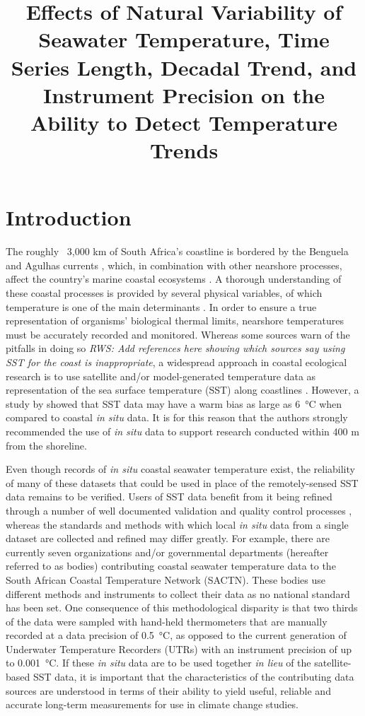 \documentclass{ametsoc}
\title{Effects of Natural Variability of Seawater Temperature, Time Series Length, Decadal Trend, and Instrument Precision on the Ability to Detect Temperature Trends}
\affiliation{Department of Biodiversity and Conservation Biology, University of the Western Cape, Bellville, Republic of South Africa}
\begin{document}
\maketitle

\section{Introduction}
The roughly ~3,000 km of South Africa's coastline is bordered by the Benguela and Agulhas currents \citep[e.g.][]{Roberts2005,Hutchings2009}, which, in combination with other nearshore processes, affect the country's marine coastal ecosystems \citep{Santos2012a}. A thorough understanding of these coastal processes is provided by several physical variables, of which temperature is one of the main determinants \citep[e.g.][]{Blanchette2008, Tittensor2010, Couce2012}. In order to ensure a true representation of organisms' biological thermal limits, nearshore temperatures must be accurately recorded and monitored. Whereas some sources warn of the pitfalls in doing so \emph{RWS: Add references here showing which sources say using SST for the coast is inappropriate}, a widespread approach in coastal ecological research is to use satellite and/or model-generated temperature data as representation of the sea surface temperature (SST) along coastlines \citep[e.g.][]{Blanchette2008, Broitman2008a, Tyberghein2012}. However, a study by \citet{Smit2013} showed that SST data may have a warm bias as large as \SI{6}{\degreeCelsius} when compared to coastal \emph{in situ} data. It is for this reason that the authors strongly recommended the use of \emph{in situ} data to support research conducted within 400 m from the shoreline.

Even though records of \emph{in situ} coastal seawater temperature exist, the reliability of many of these datasets that could be used in place of the remotely-sensed SST data remains to be verified. Users of SST data benefit from it being refined through a number of well documented validation and quality control processes \citep[e.g.][]{Reynolds1994, Brown1999, Martin2012}, whereas the standards and methods with which local \emph{in situ} data from a single dataset are collected and refined may differ greatly. For example, there are currently seven organizations and/or governmental departments (hereafter referred to as bodies) contributing coastal seawater temperature data to the South African Coastal Temperature Network (SACTN). These bodies use different methods and instruments to collect their data as no national standard has been set. One consequence of this methodological disparity is that two thirds of the data were sampled with hand-held thermometers that are manually recorded at a data precision of \SI{0.5}{\degreeCelsius}, as opposed to the current generation of Underwater Temperature Recorders (UTRs) with an instrument precision of up to \SI{0.001}{\degreeCelsius}. If these \emph{in situ} data are to be used together \emph{in lieu} of the satellite-based SST data, it is important that the characteristics of the contributing data sources are understood in terms of their ability to yield useful, reliable and accurate long-term measurements for use in climate change studies.
\end{document}
